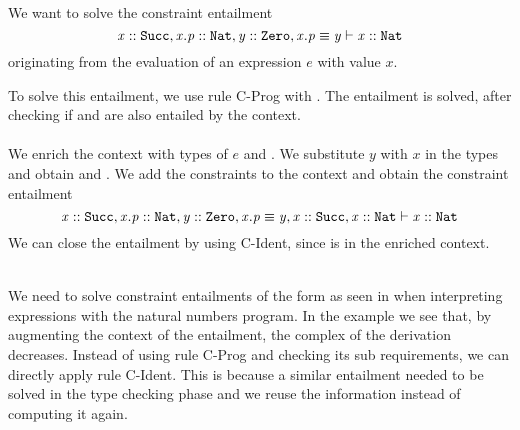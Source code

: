 \begin{example}\quad\\
\label{ex:enrich-context}
%
%
%
%
We want to solve the constraint entailment
\[ \mathit{x} :: \mathit{\texttt{Succ}}, \mathit{x.p} :: \mathit{\texttt{Nat}}, \mathit{y} :: \mathit{\texttt{Zero}}, \mathit{x.p} \equiv \mathit{y} \vdash \mathit{x} :: \mathit{\texttt{Nat}} \]
originating from the evaluation of an expression $e$ with value $x$.

To solve this entailment, we use rule C-Prog
with .
The entailment is solved, after checking if
 and 
are also entailed by the context.\\
\\
We enrich the context with types of $e$
 and
.
We substitute $y$ with $x$ in the types and obtain
 and
.
We add the constraints to the context and obtain the constraint entailment
\[ \mathit{x} :: \mathit{\texttt{Succ}}, \mathit{x.p} :: \mathit{\texttt{Nat}}, \mathit{y} :: \mathit{\texttt{Zero}}, \mathit{x.p} \equiv \mathit{y},
            \mathit{x} :: \mathit{\texttt{Succ}},\mathit{x} :: \mathit{\texttt{Nat}} \vdash \mathit{x} :: \mathit{\texttt{Nat}} \]
We can close the entailment by using C-Ident,
since  is in the enriched context.
\end{example}
\quad\\
%
We need to solve constraint entailments of the form
as seen in  when interpreting
expressions with the natural numbers program.
In the example we see that, by augmenting the
context of the entailment,
the complex of the derivation decreases.
Instead of using rule C-Prog and checking its
sub requirements, we can directly apply
rule C-Ident.
This is because a similar entailment
needed to be solved in the type checking phase
and we reuse the information instead of computing it again.
